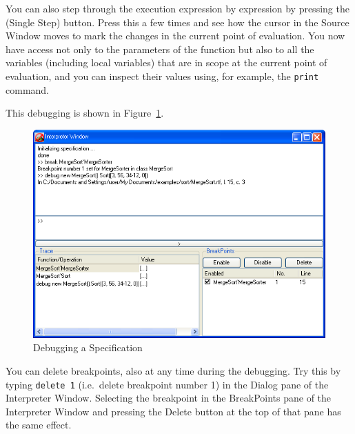 \documentclass[\pformat,12pt]{article}
\newcommand{\cmd}{\tt }
\newcommand{\guicmd}[1]{{\sf #1}}
\begin{document}
You can also step through the execution expression by expression by
pressing the 
(\guicmd{Single Step}) button. Press this a few times and 
see how the cursor in the \guicmd{Source Window} moves to mark the
changes in the current point of evaluation. You now have access not
only to the parameters of the function but also to all the variables
(including local variables) that are in scope at the current point of
evaluation, and you can inspect their values using, for example, the
{\cmd print} command.

This debugging is shown in Figure~\ref{fig:guidebug}.  


\begin{figure}[tbh]
\begin{center}
\includegraphics[width=15cm]{debugging-ppENG.png}
\caption{Debugging a Specification}

\label{fig:guidebug}
\end{center}
\end{figure}

You can delete breakpoints, also at any time during the
debugging. Try this by typing 
{\tt delete 1} (i.e.\ delete breakpoint number 1) in the
\guicmd{Dialog} pane of the \guicmd{Interpreter Window}. Selecting the
breakpoint in the \guicmd{BreakPoints} pane of the \guicmd{Interpreter
  Window} and pressing the \guicmd{Delete} button at the top of that
pane has the same effect.
\end{document}
